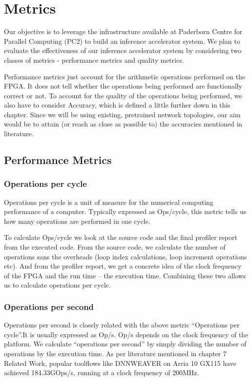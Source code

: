 \documentclass[titlepage]{report}
\begin{document}
\pagebreak





\chapter{Metrics}
Our objective is to leverage the infrastructure available at Paderborn Centre for Parallel Computing (PC2) to build an inference accelerator system. We plan to evaluate the effectiveness of our inference accelerator system by considering two classes of metrics - performance metrics and quality metrics.  

Performance metrics just account for the arithmetic operations performed on the FPGA. It does not tell whether the operations being performed are functionally correct or not. To account for the quality of the operations being performed, we also have to consider  Accuracy, which is defined  a little further down in this chapter. Since we will be using existing, pretrained network topologies, our aim would be to attain (or reach as close as possible to) the accuracies mentioned in literature.

\section{Performance Metrics}

\subsection{Operations per cycle}
Operations per cycle is a unit of measure for the numerical computing performance of a computer. Typically expressed as Ops/cycle, this metric tells us how many operations are performed in one cycle.  

To calculate Ops/cycle we look at the source code and the final profiler report from the executed code. From the source code, we calculate the number of operations sans the overheads (loop index calculations, loop increment operations etc). And from the profiler report, we get a concrete idea of the clock frequency of the FPGA and the run time – the execution time. Combining these two allows us to calculate operations per cycle.

\subsection{Operations per second}
Operations per second is closely related with the above metric “Operations per cycle”.It is usually expressed as Op/s. Op/s depends on the clock frequency of the platform. 
We calculate “operations per second” by simply dividing the number of operations by the execution time.  
As per literature mentioned in chapter 7 Related Work, popular toolflows like DNNWEAVER on Arria 10 GX115 have achieved 184.33GOps/s, running at a clock frequency of 200MHz.
\end{document}
